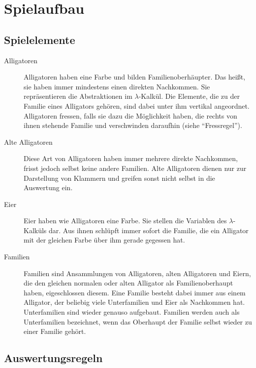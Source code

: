 \section{Spielaufbau}

\subsection{Spielelemente}

	\begin{description}
		\item[Alligatoren] Alligatoren haben eine Farbe und bilden Familienoberhäupter. Das heißt, sie haben immer mindestens einen direkten Nachkommen.
		Sie repräsentieren die Abstraktionen im \(\lambda\)-Kalkül.
		Die Elemente, die zu der Familie eines Alligators gehören, sind dabei unter ihm vertikal angeordnet.
		Alligatoren fressen, falls sie dazu die Möglichkeit haben, die rechts von ihnen stehende Familie und verschwinden daraufhin (siehe "`Fressregel"').

		\item[Alte Alligatoren] Diese Art von Alligatoren haben immer mehrere direkte Nachkommen, frisst jedoch selbst keine andere Familien.
		Alte Alligatoren dienen nur zur Darstellung von Klammern und greifen sonst nicht selbst in die Auswertung ein.

		\item[Eier] Eier haben wie Alligatoren eine Farbe.
		Sie stellen die Variablen des \(\lambda\)-Kalküls dar.
		Aus ihnen schlüpft immer sofort die Familie, die ein Alligator mit der gleichen Farbe über ihm gerade gegessen hat.

		\item[Familien] Familien sind Ansammlungen von Alligatoren, alten Alligatoren und Eiern, die den gleichen normalen oder alten Alligator als Familienoberhaupt haben, eigeschlossen diesem.
		Eine Familie besteht dabei immer aus einem Alligator, der beliebig viele Unterfamilien und Eier als Nachkommen hat.
		Unterfamilien sind wieder genauso aufgebaut.
		Familien werden auch als Unterfamilien bezeichnet, wenn das Oberhaupt der Familie selbst wieder zu einer Familie gehört.

	\end{description}

\subsection{Auswertungsregeln}

